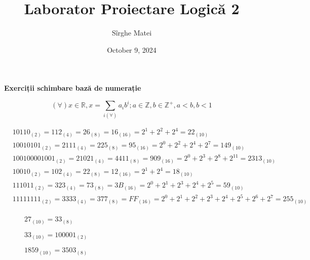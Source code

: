 \documentclass[12pt]{article}
\title{\bfseries Laborator Proiectare Logică 2}
\author{Sîrghe Matei}
\date{October 9, 2024}
\begin{document}
\maketitle

\begin{center}
    \large \textbf{Exerciții schimbare bază de numerație}
\end{center}

\begin{equation}
    (\forall) x \in \mathbb{R} , x= \sum_{i(\forall)} a_{i} b^{i} ; a \in \mathbb{Z}, b \in \mathbb{Z^{+}}, a<b, b<1
\end{equation}

\begin{align*}
    & 10110_{(2)} = 112_{(4)} = 26_{(8)} = 16_{(16)} = 2^{1} + 2^{2} + 2^{4}= 22_{(10)}\\
    & 10010101_{(2)} = 2111_{(4)} = 225_{(8)} = 95_{(16)} = 2^{0}+2^{2}+2^{4}+2^{7} = 149_{(10)}\\
    & 100100001001_{(2)}= 21021_{(4)} =4411_{(8)}=909_{(16)}=2^{0}+ 2^{3}+ 2^{8}+ 2^{11}=2313_{(10)}\\
    & 10010_{(2)}=102_{(4)}=22_{(8)}=12_{(16)}=2^{1}+ 2^{4}=18_{(10)}\\
    & 111011_{(2)}=323_{(4)}=73_{(8)}=3B_{(16)}=2^{0}+2^{1}+2^{3}+2^{4}+2^{5}=59_{(10)}\\
    & 11111111_{(2)}=3333_{(4)}=377_{(8)}=FF_{(16)}=2^{0}+2^{1}+2^{2}+2^{3}+2^{4}+2^{5}+2^{6}+2^{7}=255_{(10)}\\
\end{align*}

\begin{figure}[h!]
    \begin{minipage}{0.3\textwidth}
        $27_{(10)}=33_{(8)}$
    \end{minipage}
    \hfill
    \begin{minipage}{0.3\textwidth}
        $33_{(10)}=100001_{(2)}$
    \end{minipage}
    \hfill
    \begin{minipage}{0.3\textwidth}
        $1859_{(10)}=3503_{(8)}$
    \end{minipage}
\end{figure}
\end{document}
